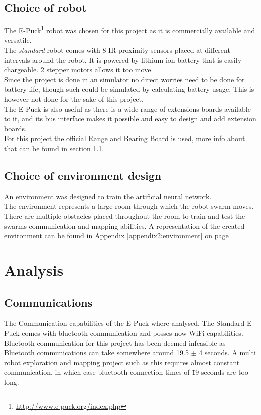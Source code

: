\subsection{Choice of robot}
The E-Puck\footnote{\url{http://www.e-puck.org/index.php}} robot was chosen for this project as it is commercially available and versatile. \\
The \textit{standard} robot comes with 8 IR proximity sensors placed at different intervals around the robot. It is powered by lithium-ion battery that is easily chargeable. 2 stepper motors allows it too move\cite{mondada2009puck}. \\

Since the project is done in an simulator no direct worries need to be done for battery life, though such could be simulated by calculating battery usage. This is however not done for the sake of this project. \\

The E-Puck is also useful as there is a wide range of extensions boards available to it, and its bus interface makes it possible and easy to design and add extension boards. \\
For this project the official Range and Bearing Board is used, more info about that can be found in section \ref{chap1:communication}\cite{Gutierrez}.

\subsection{Choice of environment design}
An environment was designed to train the artificial neural network.\\
The environment represents a large room through which the robot swarm moves. There are multiple obstacles placed throughout the room to train and test the swarms communication and mapping abilities. A representation of the created environment can be found in Appendix  \ref{appendix2:environment} on page \pageref{appendix2:environment}. \\




\section{Analysis}

\subsection{Communications}
\label{chap1:communication}
The Communication capabilities of the E-Puck where analysed. The Standard E-Puck comes  with bluetooth communication and posses now WiFi capabilities. \\
Bluetooth  communication for this project has been deemed infeasible as Bluetooth communications can take somewhere around 19.5 $\pm$ 4 seconds. A multi robot exploration and mapping project such as this requires almost constant communication, in which case bluetooth connection times of \~19 seconds are too long.\\

